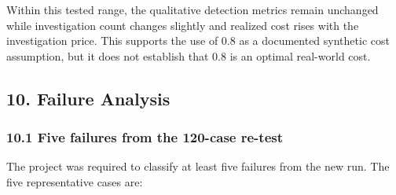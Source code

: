 \documentclass[
]{article}
\begin{document}
Within this tested range, the qualitative detection metrics remain
unchanged while investigation count changes slightly and realized cost
rises with the investigation price. This supports the use of 0.8 as a
documented synthetic cost assumption, but it does not establish that 0.8
is an optimal real-world cost.

\subsection{10. Failure Analysis}\label{failure-analysis}

\subsubsection{10.1 Five failures from the 120-case
re-test}\label{five-failures-from-the-120-case-re-test}

The project was required to classify at least five failures from the new
run. The five representative cases are:
\end{document}
